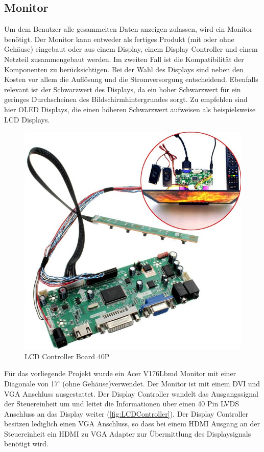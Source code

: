 \subsection{Monitor}
Um dem Benutzer alle gesammelten Daten anzeigen zulassen, wird ein Monitor benötigt. Der Monitor kann entweder als fertiges Produkt (mit oder ohne Gehäuse) eingebaut oder aus einem Display, einem Display Controller und einem Netzteil zusammengebaut werden. Im zweiten Fall ist die Kompatibilität der Komponenten zu berücksichtigen. Bei der Wahl des Displays sind neben den Kosten vor allem die Auflösung und die Stromversorgung entscheidend. Ebenfalls relevant ist der Schwarzwert des Displays, da ein hoher Schwarzwert für ein geringes Durchscheinen des Bildschirmhintergrundes sorgt. Zu empfehlen sind hier OLED Displays, die einen höheren Schwarzwert aufweisen als beispielsweise LCD Displays.  
\begin{figure}[H]
	\includegraphics[trim=0mm 0mm 0mm 0mm, scale=1]{bilder/dcontroller.jpg}
	\caption{LCD Controller Board 40P}
	\label{fig:LCDController}
\end{figure}
Für das vorliegende Projekt wurde ein Acer V176Lbmd Monitor mit einer Diagonale von 17' (ohne Gehäuse)verwendet. Der Monitor ist mit einem DVI und VGA Anschluss ausgestattet. Der Display Controller wandelt das Ausgangssignal der Steuereinheit um und leitet die Informationen über einen 40 Pin LVDS Anschluss an das Display weiter (\autoref{fig:LCDController}). Der Display Controller besitzen lediglich einen VGA Anschluss, so dass bei einem HDMI Ausgang an der Steuereinheit ein HDMI zu VGA Adapter zur Übermittlung des Displaysignals benötigt wird.
 

